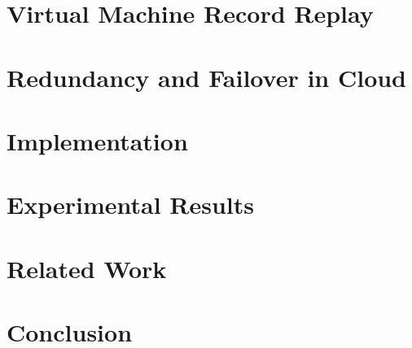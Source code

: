 \documentclass[preprint,9pt]{sigplanconf}
\begin{document}
\section{Virtual Machine Record Replay}
\label{sec:record_replay}
\section{Redundancy and Failover in Cloud}
\label{sec:failover}
\section{Implementation}
\label{sec:implementation}
\section{Experimental Results}
\label{sec:results}
\section{Related Work}
\label{sec:relwork}
\section{Conclusion}
\label{sec:conclusion}


\end{document}
